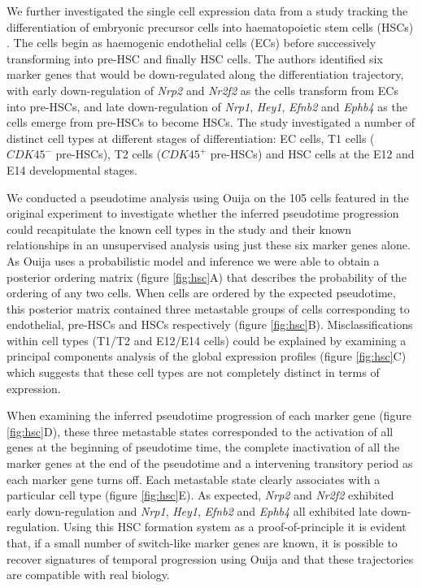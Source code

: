 We further investigated the single cell expression data from a study tracking the differentiation of embryonic precursor cells into haematopoietic stem cells (HSCs) \cite{zhou2016tracing}. The cells begin as haemogenic endothelial cells (ECs) before successively transforming  into pre-HSC and finally HSC cells. The authors identified six marker genes that would be down-regulated along the differentiation trajectory, with early down-regulation of \emph{Nrp2} and \emph{Nr2f2} as the cells transform from ECs into pre-HSCs, and late down-regulation of \emph{Nrp1}, \emph{Hey1}, \emph{Efnb2} and \emph{Ephb4} as the cells emerge from pre-HSCs to become HSCs. The study investigated a number of distinct cell types at different stages of differentiation: EC cells, T1 cells ($CDK45^-$ pre-HSCs), T2 cells ($CDK45^+$ pre-HSCs) and HSC cells at the E12 and E14 developmental stages.

We conducted a pseudotime analysis using Ouija on the 105 cells featured in the original experiment to investigate whether the inferred pseudotime progression could recapitulate the known cell types in the study and their known relationships in an unsupervised analysis using just these six marker genes alone. As Ouija uses a probabilistic model and inference we were able to obtain a posterior ordering matrix (figure \ref{fig:hsc}A) that describes the probability of the ordering of any two cells. When cells are ordered by the expected pseudotime, this posterior matrix contained three metastable groups of cells corresponding to endothelial, pre-HSCs and HSCs respectively (figure \ref{fig:hsc}B). Misclassifications within cell types (T1/T2 and E12/E14 cells) could be explained by examining a principal components analysis of the global expression profiles (figure \ref{fig:hsc}C) which suggests that these cell types are not completely distinct in terms of expression.

When examining the inferred pseudotime progression of each marker gene (figure \ref{fig:hsc}D), these three metastable states corresponded to the activation of all genes at the beginning of pseudotime time, the complete inactivation of all the marker genes at the end of the pseudotime and a intervening transitory period as each marker gene turns off. Each metastable state clearly associates with a particular cell type (figure \ref{fig:hsc}E). As expected, \emph{Nrp2} and \emph{Nr2f2} exhibited early down-regulation and \emph{Nrp1}, \emph{Hey1}, \emph{Efnb2} and \emph{Ephb4} all exhibited late down-regulation. Using this HSC formation system as a proof-of-principle it is evident that, if a small number of switch-like marker genes are known, it is possible to recover signatures of temporal progression using Ouija and that these trajectories are compatible with real biology.

